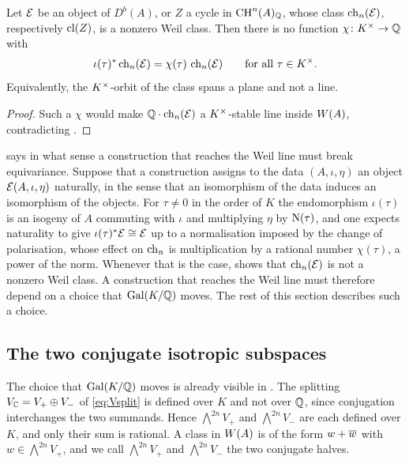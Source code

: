 \begin{corollary}\label{cor:orbitcriterion}
Let $\mathcal{E}$ be an object of $D^{b}(A)$, or $Z$ a cycle in $\operatorname{CH}^{n}(A)_{\mathbb{Q}}$,
whose class $\operatorname{ch}_{n}(\mathcal{E})$, respectively $\mathrm{cl}(Z)$, is a nonzero Weil class.
Then there is no function $\chi\colon K^{\times}\to\mathbb{Q}$ with
\[
  \iota(\tau)^{*}\operatorname{ch}_{n}(\mathcal{E})=\chi(\tau)\,\operatorname{ch}_{n}(\mathcal{E})
  \qquad\text{for all }\tau\in K^{\times} .
\]
Equivalently, the $K^{\times}$-orbit of the class spans a plane and not a line.
\end{corollary}

\begin{proof}
Such a $\chi$ would make $\mathbb{Q}\cdot\operatorname{ch}_{n}(\mathcal{E})$ a $K^{\times}$-stable line inside
$W(A)$, contradicting .
\end{proof}

 says in what sense a construction that reaches the
Weil line must break equivariance. Suppose that a construction assigns to the data
$(A,\iota,\eta)$ an object $\mathcal{E}(A,\iota,\eta)$ naturally, in the sense that
an isomorphism of the data induces an isomorphism of the objects. For
$\tau\ne0$ in the order of $K$ the endomorphism $\iota(\tau)$ is an isogeny of
$A$ commuting with $\iota$ and multiplying $\eta$ by $\mathrm{N}(\tau)$, and one
expects naturality to give $\iota(\tau)^{*}\mathcal{E}\cong\mathcal{E}$ up to a
normalisation imposed by the change of polarisation, whose effect on
$\operatorname{ch}_{n}$ is multiplication by a rational number $\chi(\tau)$, a power of the
norm. Whenever that is the case,  shows that
$\operatorname{ch}_{n}(\mathcal{E})$ is not a nonzero Weil class. A construction that reaches the
Weil line must therefore depend on a choice that $\operatorname{Gal}(K/\mathbb{Q})$ moves. The rest
of this section describes such a choice.

\subsection{The two conjugate isotropic subspaces}

The choice that $\operatorname{Gal}(K/\mathbb{Q})$ moves is already visible in
. The splitting
$V_{\mathbb{C}}=V_{+}\oplus V_{-}$ of \eqref{eq:Vsplit} is defined over $K$ and not
over $\mathbb{Q}$, since conjugation interchanges the two summands. Hence
$\bigwedge^{2n}V_{+}$ and $\bigwedge^{2n}V_{-}$ are each defined over $K$,
and only their sum is rational. A class in $W(A)$ is of the form
$w+\overline{w}$ with $w\in\bigwedge^{2n}V_{+}$, and we call $\bigwedge^{2n}V_{+}$
and $\bigwedge^{2n}V_{-}$ the two conjugate halves.

